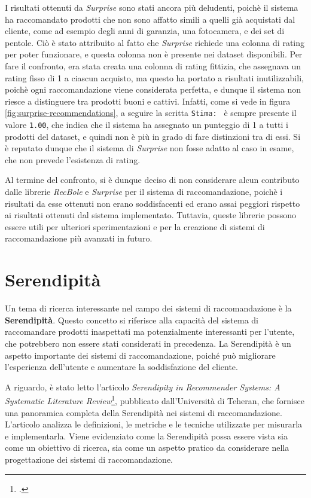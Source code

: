 I risultati ottenuti da \emph{Surprise} sono stati ancora più deludenti, poichè il sistema ha raccomandato prodotti che non sono affatto simili a quelli già acquistati dal cliente, come ad esempio degli anni di garanzia, una fotocamera, e dei set di pentole. Ciò è stato attribuito al fatto che \emph{Surprise} richiede una colonna di rating per poter funzionare, e questa colonna non è presente nei dataset disponibili. Per fare il confronto, era stata creata una colonna di rating fittizia, che assegnava un rating fisso di 1 a ciascun acquisto, ma questo ha portato a risultati inutilizzabili, poichè ogni raccomandazione viene considerata perfetta, e dunque il sistema non riesce a distinguere tra prodotti buoni e cattivi. Infatti, come si vede in figura \ref{fig:surprise-recommendations}, a seguire la scritta \texttt{Stima: } è sempre presente il valore \texttt{1.00}, che indica che il sistema ha assegnato un punteggio di 1 a tutti i prodotti del dataset, e quindi non è più in grado di fare distinzioni tra di essi. Si è reputato dunque che il sistema di \emph{Surprise} non fosse adatto al caso in esame, che non prevede l'esistenza di rating.

Al termine del confronto, si è dunque deciso di non considerare alcun contributo dalle librerie \emph{RecBole} e \emph{Surprise} per il sistema di raccomandazione, poichè i risultati da esse ottenuti non erano soddisfacenti ed erano assai peggiori rispetto ai risultati ottenuti dal sistema implementato. Tuttavia, queste librerie possono essere utili per ulteriori sperimentazioni e per la creazione di sistemi di raccomandazione più avanzati in futuro.


\section{Serendipità}

Un tema di ricerca interessante nel campo dei sistemi di raccomandazione è la \textbf{Serendipità}. Questo concetto si riferisce alla capacità del sistema di raccomandare prodotti inaspettati ma potenzialmente interessanti per l'utente, che potrebbero non essere stati considerati in precedenza. La Serendipità è un aspetto importante dei sistemi di raccomandazione, poiché può migliorare l'esperienza dell'utente e aumentare la soddisfazione del cliente.

A riguardo, è stato letto l'articolo \emph{Serendipity in Recommender Systems: A Systematic Literature Review}\footcite{article:serendipity-recommender-systems}, pubblicato dall'Università di Teheran, che fornisce una panoramica completa della Serendipità nei sistemi di raccomandazione. L'articolo analizza le definizioni, le metriche e le tecniche utilizzate per misurarla e implementarla. Viene evidenziato come la Serendipità possa essere vista sia come un obiettivo di ricerca, sia come un aspetto pratico da considerare nella progettazione dei sistemi di raccomandazione.

